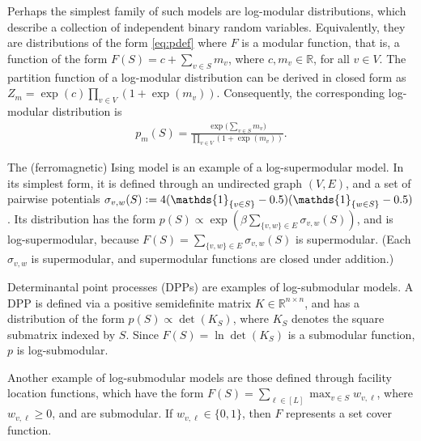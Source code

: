 \begin{example}
Perhaps the simplest family of such models are log-modular distributions, which describe a collection of independent binary random variables.
Equivalently, they are distributions of the form \eqref{eq:pdef} where $F$ is a modular function, that is, a function of the form $F(S) = c + \sum_{v \in S}m_v$, where $c, m_v \in \mathbb{R}$, for all $v \in V$.
The partition function of a log-modular distribution can be derived in closed form as $Z_m = \exp(c) \prod_{v \in V} \left( 1 + \exp(m_v) \right)$.
Consequently, the corresponding log-modular distribution is
\begin{align*}
  p_m(S) = \frac{\exp\big( \sum_{v \in S} m_v \big)}{\prod_{v \in V} \left( 1 + \exp(m_v) \right)}.
\end{align*}
\end{example}

\begin{example}
\citep{ising}
The (ferromagnetic) Ising model is an example of a log-supermodular model.
In its simplest form, it is defined through an undirected graph $(V, E)$, and a set of pairwise potentials $\sigma_{v,w}(S) \defeq 4(\mathds{1}_{\{v \in S\}}-0.5)(\mathds{1}_{\{w \in S\}}-0.5)$.
Its distribution has the form $p(S) \propto \exp(\beta\sum_{\{v,w\} \in E} \sigma_{v,w}(S))$, and is log-supermodular, because $F(S) = \sum_{\{v,w\} \in E} \sigma_{v,w}(S)$ is supermodular. (Each $\sigma_{v,w}$ is supermodular, and supermodular functions are closed under addition.)
\end{example}

\begin{example}
\citep{lyons03,kulesza12}
Determinantal point processes (DPPs) are examples of log-submodular models.
A DPP is defined via a positive semidefinite matrix $K \in \mathbb{R}^{n \times n}$, and has a distribution of the form $p(S) \propto \det(K_S)$, where $K_S$ denotes the square submatrix indexed by $S$.
Since $F(S) = \ln \det(K_S)$ is a submodular function, $p$ is log-submodular.
\end{example}

\begin{example}[\flid{}]
\citep{tschiatschek16}
Another example of log-submodular models are those defined through facility location functions, which have the form $F(S) = \sum_{\ell \in [L]} \max_{v \in S}w_{v,\ell}$, where $w_{v,\ell} \geq 0$, and are submodular.
If $w_{v,\ell} \in \{0, 1\}$, then $F$ represents a set cover function.
\end{example}

